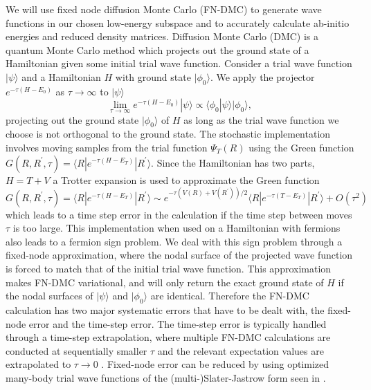 \documentclass{article}
\begin{document}
We will use fixed node diffusion Monte Carlo (FN-DMC) to generate
wave functions in our chosen low-energy subspace and to accurately calculate ab-initio energies and reduced density matrices. 
Diffusion Monte Carlo (DMC) is a quantum Monte Carlo method which projects out the ground state of a Hamiltonian given some initial trial wave function. 
Consider a trial wave function $|\psi\rangle$ and a Hamiltonian $H$ with ground state $|\phi_0\rangle$. 
We apply the projector $e^{-\tau (H-E_0)}$ as $\tau \rightarrow \infty$ to $|\psi \rangle$
\begin{equation}
\lim_{\tau \rightarrow \infty} e^{-\tau (H-E_0)} |\psi\rangle \propto \langle \phi_0|\psi\rangle |\phi_0\rangle,
\end{equation}
projecting out the ground state $|\phi_0\rangle$ of $H$ as long as the trial wave function we choose is not orthogonal to the ground state. 
The stochastic implementation involves moving samples from the trial function $\Psi_T(R)$ using the Green function $G(R, R^\prime, \tau) = \langle R | e^{-\tau(H - E_T)} | R^\prime \rangle$. 
Since the Hamiltonian has two parts, $H = T + V$ a Trotter expansion is used to approximate the Green function $G(R, R^\prime, \tau) = \langle R | e^{-\tau(H - E_T)} | R^\prime \rangle \sim e^{-\tau(V(R) + V(R^\prime))/2} \langle R| e^{-\tau(T - E_T)}|R^\prime \rangle + O(\tau^2) $ which leads to a time step error in the calculation if the time step between moves $\tau$ is too large. 
This implementation when used on a Hamiltonian with fermions also leads to a fermion sign problem. 
We deal with this sign problem through a fixed-node approximation, where the nodal surface of the projected wave function is forced to match that of the initial trial wave function. 
This approximation makes FN-DMC variational, and will only return the exact ground state of $H$ if the nodal surfaces of $|\psi\rangle$ and $|\phi_0\rangle$ are identical. 
Therefore the FN-DMC calculation has two major systematic errors that have to be dealt with, the fixed-node error and the time-step error. 
The time-step error is typically handled through a time-step extrapolation, where multiple FN-DMC calculations are conducted at sequentially smaller $\tau$ and the relevant expectation values are extrapolated to $\tau \rightarrow 0$ \cite{Needs2010}. 
Fixed-node error can be reduced by using optimized many-body trial wave functions of the (multi-)Slater-Jastrow form seen in \cite{PhysRevLett.98.110201}.
\end{document}

